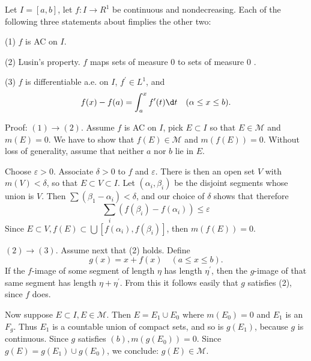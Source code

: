 \documentclass[12pt, a4paper, oneside]{book}
\begin{document}
\begin{theorem}
    Let $I=[a, b]$, let $f: I \rightarrow R^1$ be continuous and nondecreasing. Each of the following three statements about fimplies the other two:

    (1) $f$ is AC on $I$.

    (2) Lusin's property. $f$ maps sets of measure $0$ to sets of measure $0$ .

    (3) $f$ is differentiable a.e. on $I$, $f^{\prime} \in L^1$, and
    \begin{equation*}
        f(x)-f(a)=\int_a^x f^{\prime}(t) \d t \quad(\alpha \leq x \leq b) .
    \end{equation*}


    Proof:
    $(1) \rightarrow (2)$.
    Assume $f$ is AC on $I$, pick $E \subset I$ so that $E \in \mathcal{M}$ and $m(E)=0$.
    We have to show that $f(E) \in \mathcal{M}$ and $m(f(E))=0$. Without loss of generality, assume that neither $a$ nor $b$ lie in $E$.

    Choose $\varepsilon>0$. Associate $\delta>0$ to $f$ and $\varepsilon$.
    There is then an open set $V$ with $m(V)<\delta$, so that $E \subset V \subset I$. Let $\left(\alpha_i, \beta_i\right)$ be the disjoint segments whose union is $V$. Then $\sum\left(\beta_1-\alpha_i\right)<\delta$, and our choice of $\delta$ shows that therefore
    \begin{equation*}
        \sum_i\left(f\left(\beta_i\right)-f\left(\alpha_i\right)\right) \leq \varepsilon
    \end{equation*}
    Since $E \subset V, f(E) \subset \bigcup\left[f\left(\alpha_i\right), f\left(\beta_i\right)\right]$, then $m(f(E))=0$.

    $(2) \rightarrow (3)$.
    Assume next that (2) holds. Define
    \begin{equation*}
        g(x)=x+f(x) \quad(a \leq x \leq b) .
    \end{equation*}
    If the $f$-image of some segment of length $\eta$ has length $\eta^{\prime}$, then the $g$-image of that same segment has length $\eta+\eta^{\prime}$. From this it follows easily that $g$ satisfies (2), since $f$ does.

    Now suppose $E \subset I, E \in \mathcal{M}$. Then $E=E_1 \cup E_0$ where $m\left(E_0\right)=0$ and $E_1$ is an $F_g$.
    Thus $E_1$ is a countable union of compact sets, and so is $g\left(E_1\right)$, because $g$ is continuous.
    Since $g$ satisfies $(b), m\left(g\left(E_0\right)\right)=0$. Since $g(E)=g\left(E_1\right) \cup g\left(E_0\right)$, we conclude: $g(E) \in \mathcal{M}$.


\end{theorem}
\end{document}
